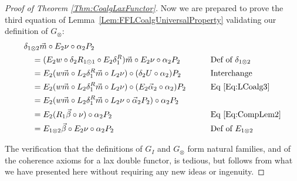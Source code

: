 \begin{proof}[Proof of Theorem \ref{Thm:CoalgLaxFunctor}]
	Now we are prepared to prove the third equation of Lemma~\ref{Lem:FFLCoalgUniversalProperty} validating our definition of $G_{\otimes}$:
	\begin{alignat*}{2}
		\hspace{1em}&\hspace{-1em} \delta_{1\otimes2}\vec{m} \circ E_2\nu \circ \alpha_2P_2 && \\
		&= (E_2w \circ \delta_2R_{1\odot1} \circ E_2\delta_1^R)\vec{m} \circ E_2\nu \circ \alpha_2P_2
			&& \text{Def of $\delta_{1\otimes2}$} \\
		&= E_2(w\vec{m} \circ L_2\delta_1^R\vec{m} \circ L_2\nu) \circ (\delta_2U \circ \alpha_2)P_2
			&& \text{Interchange} \\
		&= E_2(w\vec{m} \circ L_2\delta_1^R\vec{m} \circ L_2\nu) \circ (E_2\vec{\alpha}_2 \circ \alpha_2)P_2
			&\qquad& \text{Eq \eqref{Eq:LCoalg3}} \\
		&= E_2(w\vec{m} \circ L_2\delta_1^R\vec{m} \circ L_2\nu \circ \vec{\alpha}_2P_2) \circ \alpha_2P_2 && \\
		&= E_2(R_1\vec{\beta}\circ\nu) \circ \alpha_2P_2
			&& \text{Eq \eqref{Eq:CompLem2}} \\
		&= E_{1\otimes 2}\vec{\beta} \circ E_2\nu \circ \alpha_2P_2
			&& \text{Def of $E_{1\otimes2}$}
	\end{alignat*}

	The verification that the definitions of $G_I$ and $G_{\otimes}$ form natural families, and of the coherence axioms for a lax double functor, is tedious, but follows from what we have presented here without requiring any new ideas or ingenuity.
\end{proof}

